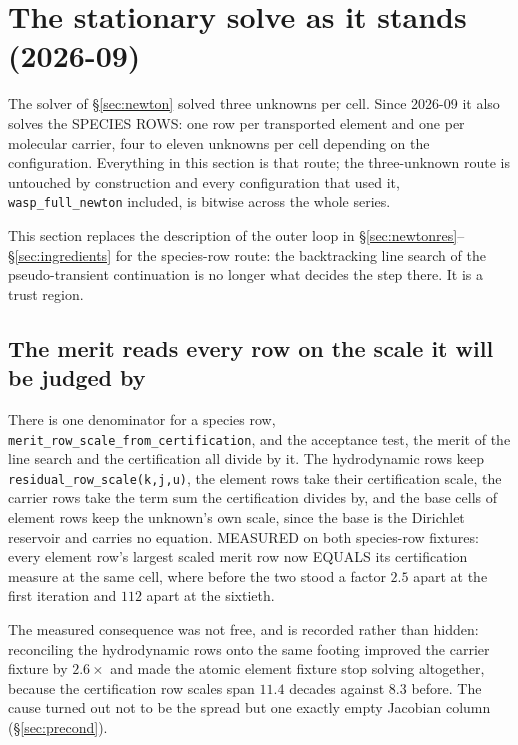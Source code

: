 \documentclass[english,a4paper]{my_memo}
\newcommand{\code}[1]{\texttt{#1}}
\begin{document}
\section{The stationary solve as it stands (2026-09)}
\label{sec:stage2}

The solver of \S\ref{sec:newton} solved three unknowns per cell. Since
2026-09 it also solves the SPECIES ROWS: one row per transported element and
one per molecular carrier, four to eleven unknowns per cell depending on the
configuration. Everything in this section is that route; the three-unknown
route is untouched by construction and every configuration that used it,
\code{wasp\_full\_newton} included, is bitwise across the whole series.

This section replaces the description of the outer loop in
\S\ref{sec:newtonres}--\S\ref{sec:ingredients} for the species-row route: the
backtracking line search of the pseudo-transient continuation is no longer
what decides the step there. It is a trust region.

\subsection{The merit reads every row on the scale it will be judged by}
\label{sec:meritscale}

There is one denominator for a species row,
\code{merit\_row\_scale\_from\_certification}, and the acceptance test, the
merit of the line search and the certification all divide by it. The
hydrodynamic rows keep \code{residual\_\allowbreak row\_scale(k,j,u)}, the element rows
take their certification scale, the carrier rows take the term sum the
certification divides by, and the base cells of element rows keep the
unknown's own scale, since the base is the Dirichlet reservoir and carries no
equation. MEASURED on both species-row fixtures: every element row's largest
scaled merit row now EQUALS its certification measure at the same cell, where
before the two stood a factor $2.5$ apart at the first iteration and $112$
apart at the sixtieth.

The measured consequence was not free, and is recorded rather than hidden:
reconciling the hydrodynamic rows onto the same footing improved the carrier
fixture by $2.6\times$ and made the atomic element fixture stop solving
altogether, because the certification row scales span $11.4$ decades against
$8.3$ before. The cause turned out not to be the spread but one exactly empty
Jacobian column (\S\ref{sec:precond}).
\end{document}
